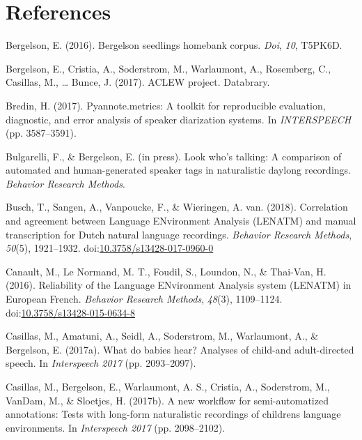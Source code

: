\documentclass[english,floatsintext,man]{apa6}
\begin{document}
\newpage

\section{References}\label{references}

\setlength{\parindent}{-0.5in} \setlength{\leftskip}{0.5in}

\hypertarget{refs}{}
\hypertarget{ref-bergelson2016bergelson}{}
Bergelson, E. (2016). Bergelson seedlings homebank corpus. \emph{Doi},
\emph{10}, T5PK6D.

\hypertarget{ref-bergelson2017}{}
Bergelson, E., Cristia, A., Soderstrom, M., Warlaumont, A., Rosemberg,
C., Casillas, M., \ldots{} Bunce, J. (2017). ACLEW project. Databrary.

\hypertarget{ref-bredin2017pyannote}{}
Bredin, H. (2017). Pyannote.metrics: A toolkit for reproducible
evaluation, diagnostic, and error analysis of speaker diarization
systems. In \emph{INTERSPEECH} (pp. 3587--3591).

\hypertarget{ref-bulgarelli2019}{}
Bulgarelli, F., \& Bergelson, E. (in press). Look who's talking: A
comparison of automated and human-generated speaker tags in naturalistic
daylong recordings. \emph{Behavior Research Methods}.

\hypertarget{ref-Busch2018}{}
Busch, T., Sangen, A., Vanpoucke, F., \& Wieringen, A. van. (2018).
Correlation and agreement between Language ENvironment Analysis (LENATM)
and manual transcription for Dutch natural language recordings.
\emph{Behavior Research Methods}, \emph{50}(5), 1921--1932.
doi:\href{https://doi.org/10.3758/s13428-017-0960-0}{10.3758/s13428-017-0960-0}

\hypertarget{ref-Canault2016}{}
Canault, M., Le Normand, M. T., Foudil, S., Loundon, N., \& Thai-Van, H.
(2016). Reliability of the Language ENvironment Analysis system (LENATM)
in European French. \emph{Behavior Research Methods}, \emph{48}(3),
1109--1124.
doi:\href{https://doi.org/10.3758/s13428-015-0634-8}{10.3758/s13428-015-0634-8}

\hypertarget{ref-casillas2017b}{}
Casillas, M., Amatuni, A., Seidl, A., Soderstrom, M., Warlaumont, A., \&
Bergelson, E. (2017a). What do babies hear? Analyses of child-and
adult-directed speech. In \emph{Interspeech 2017} (pp. 2093--2097).

\hypertarget{ref-casillas2017a}{}
Casillas, M., Bergelson, E., Warlaumont, A. S., Cristia, A., Soderstrom,
M., VanDam, M., \& Sloetjes, H. (2017b). A new workflow for
semi-automatized annotations: Tests with long-form naturalistic
recordings of childrens language environments. In \emph{Interspeech
2017} (pp. 2098--2102).
\end{document}
